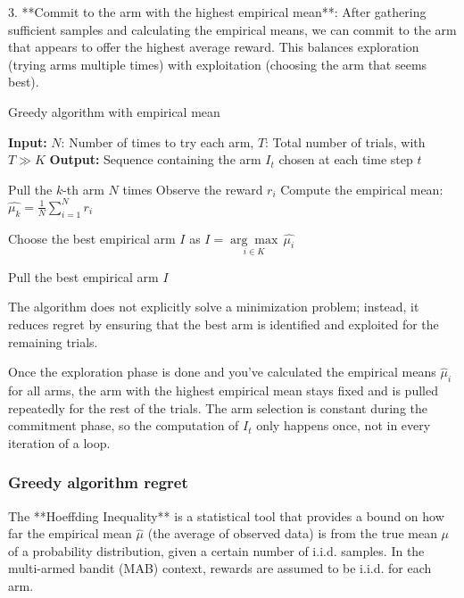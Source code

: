 3. **Commit to the arm with the highest empirical mean**: After gathering sufficient samples and calculating the empirical means, we can commit to the arm that appears to offer the highest average reward. This balances exploration (trying arms multiple times) with exploitation (choosing the arm that seems best).

\begin{algorithm}
    \caption{Greedy algorithm with empirical mean}
    \begin{algorithmic}[1]
        \State \textbf{Input:} $N$: Number of times to try each arm, $T$: Total number of trials, with $T \gg K$
        \State \textbf{Output:} Sequence containing the arm $I_t$ chosen at each time step $t$

        \State Pull the $k$-th arm $N$ times
        \State Observe the reward $r_i$
        \EndFor
        \State Compute the empirical mean: $\hat{\mu_k} = \frac{1}{N} \sum_{i=1}^{N} r_i$
        \EndFor

        \State Choose the best empirical arm $I$ as $I = \underset{i \in K}{\arg\max} \, \hat{\mu_i}$

        \State Pull the best empirical arm $I$
        \EndFor

    \end{algorithmic}
\end{algorithm}

\begin{warningbox}
    The algorithm does not explicitly solve a minimization problem; instead, it reduces regret by ensuring that the best arm is identified and exploited for the remaining trials.
\end{warningbox}

Once the exploration phase is done and you've calculated the empirical means $\hat{\mu}_i$ for all arms, the arm with the highest empirical mean stays fixed and is pulled repeatedly for the rest of the trials. The arm selection is constant during the commitment phase, so the computation of $I_t$ only happens once, not in every iteration of a loop.

\subsubsection{Greedy algorithm regret}


The **Hoeffding Inequality** is a statistical tool that provides a bound on how far the empirical mean $\hat{\mu}$ (the average of observed data) is from the true mean $\mu$ of a probability distribution, given a certain number of i.i.d. samples. In the multi-armed bandit (MAB) context, rewards are assumed to be i.i.d. for each arm.

